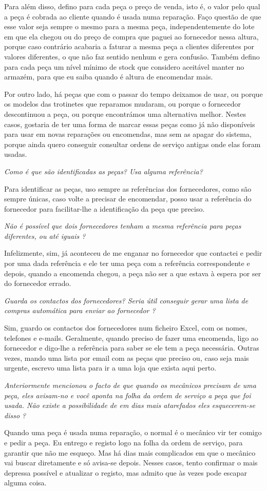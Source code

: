 \documentclass[11pt,a4paper]{article}
\newcommand{\pergunta}[1]{\item[P:] \textit{#1}}
\newcommand{\resposta}[1]{\item[R:] #1}
\begin{document}
\begin{transcription}
{			Para além disso, defino para cada peça o preço de venda, isto é, o valor pelo qual a peça é cobrada ao cliente quando é usada numa reparação. Faço questão de que esse valor seja sempre o mesmo para a mesma peça, independentemente do lote em que ela chegou ou do preço de compra que paguei ao fornecedor nessa altura, porque caso contrário acabaria a faturar a mesma peça a clientes diferentes por valores diferentes, o que não faz sentido nenhum e gera confusão. Também defino para cada peça um nível mínimo de stock que considero aceitável manter no armazém, para que eu saiba quando é altura de encomendar mais.
			
			Por outro lado, há peças que com o passar do tempo deixamos de usar, ou porque os modelos das trotinetes que reparamos mudaram, ou porque o fornecedor descontinuou a peça, ou porque encontrámos uma alternativa melhor. Nestes casos, gostaria de ter uma forma de marcar essas peças como já não disponíveis para usar em novas reparações ou encomendas, mas sem as apagar do sistema, porque ainda quero conseguir consultar ordens de serviço antigas onde elas foram usadas.}
		
		\pergunta{Como é que são identificadas as peças? Usa alguma referência?}
		\resposta{Para identificar as peças, uso sempre as referências dos fornecedores, como são sempre únicas, caso volte a precisar de encomendar, posso usar a referência do fornecedor para facilitar-lhe a identificação da peça que preciso.}
		
		\pergunta{Não é possível que dois fornecedores tenham a mesma referência para peças diferentes, ou até iguais ?}
		\resposta{Infelizmente, sim, já aconteceu de me enganar no fornecedor que contactei e pedir por uma dada referência e ele ter uma peça com a referência correspondente e depois, quando a encomenda chegou, a peça não ser a que estava à espera por ser do fornecedor errado.}
		
		\pergunta{Guarda os contactos dos fornecedores? Seria útil conseguir gerar uma lista de compras automática para enviar ao fornecedor ?}
		
		\resposta{Sim, guardo os contactos dos fornecedores num ficheiro Excel, com os nomes, telefones e e-mails. Geralmente, quando preciso de fazer uma encomenda, ligo ao fornecedor e digo-lhe a referência para saber se ele tem a peça necessária. Outras vezes, mando uma lista por email com as peças que preciso ou, caso seja mais urgente, escrevo uma lista para ir a uma loja que exista aqui perto.}
		
		\pergunta{Anteriormente mencionou o facto de que quando os mecânicos precisam de uma peça, eles avisam-no e você aponta na folha da ordem de serviço a peça que foi usada. Não existe a possibilidade de em dias mais atarefados eles esquecerem-se disso ?}
		\resposta{Quando uma peça é usada numa reparação, o normal é o mecânico vir ter comigo e pedir a peça. Eu entrego e registo logo na folha da ordem de serviço, para garantir que não me esqueço. Mas há dias mais complicados em que o mecânico vai buscar diretamente e só avisa-se depois. Nesses casos, tento confirmar o mais depressa possível e atualizar o registo, mas admito que às vezes pode escapar alguma coisa.
			
}
\end{transcription}
\end{document}
